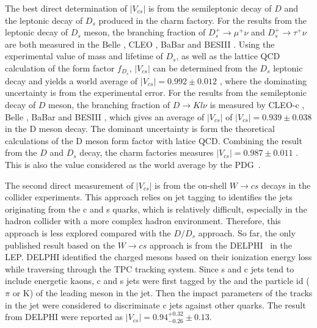 The best direct determination of $|V_{cs}|$ is from the semileptonic decay of $D$ and the leptonic decay of $D_s$ produced in the charm factory. For the results from the leptonic decay of $D_s$ meson, the branching fraction of $D_s^+ \to \mu^+ \nu$ and $D_s^+ \to \tau^+ \nu$ are both measured in the Belle \cite{Zupanc:2013byn}, CLEO \cite{Alexander:2009ux,Onyisi:2009th,Naik:2009tk}, BaBar \cite{delAmoSanchez:2010jg} and BESIII \cite{Ablikim:2016duz, Ablikim:2018jun}. Using the experimental value of mass and lifetime of $D_s$, as well as the lattice QCD calculation of the form factor $f_{D_s}$, $|V_{cs}|$ can be determined from the $D_s$ leptonic decay and yields a world average of $|V_{cs}|=0.992\pm 0.012$ \cite{Amhis:2019ckw}, where the dominating uncertainty is from the experimental error. For the results from the semileptonic decay of $D$ meson, the branching fraction of $D\to K l\nu$ is measured by CLEO-c \cite{Besson:2009uv}, Belle \cite{Widhalm:2006wz}, BaBar \cite{Aubert:2007wg} and BESIII \cite{Ablikim:2015ixa, Ablikim:2018evp}, which gives an average of $|V_{cs}|$ of $|V_{cs}|=0.939\pm 0.038$ \cite{Amhis:2019ckw} in the D meson decay. The dominant uncertainty is form the theoretical calculations of the D meson form factor with latice QCD. Combining the result from the $D$ and $D_s$ decay, the charm factories measures $|V_{cs}|=0.987\pm 0.011$ \cite{Amhis:2019ckw}. This is also the value considered as the world average by the PDG~\cite{pdg2020}.

The second direct measurement of $|V_{cs}|$ is from the on-shell $W\to c s$ decays in the collider experiments. This approach relies on jet tagging to identifies the jets originating from the c and s quarks, which is relatively difficult, especially in the hadron collider with a more complex hadron environment. Therefore, this approach is less explored compared with the $D/D_s$ approach. So far, the only published result based on the $W\to c s$  approach is from the DELPHI~\cite{Abreu:1998ap} in the LEP. DELPHI identified the charged mesons based on their ionization energy loss while traversing through the TPC tracking system. Since s and c jets tend to include energetic kaons, c and s jets were first tagged by the \pt and the particle id ($\pi$ or K) of the leading meson in the jet. Then the impact parameters of the tracks in the jet were considered to discriminate c jets against other quarks. The result from DELPHI were reported as $|V_{cs}|=0.94 ^{+0.32}_{-0.26}\pm 0.13$. 


